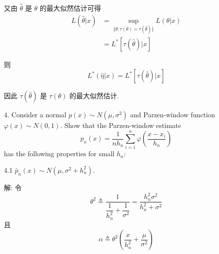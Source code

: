 \documentclass[openany]{ctexbook}
\theoremstyle{kaiti}
\theoremstyle{normal}
\begin{document}
又由 $\hat{\theta}$ 是 $\theta$ 的最大似然估计可得
\begin{equation}
  \begin{aligned}
    L(\hat{\theta}|x)
    &=\sup_{\{\theta:\tau(\theta)=\tau(\hat{\theta})\}}L(\theta|x)\\
    &=L^*[\tau(\hat{\theta})|x]
  \end{aligned}
\end{equation}

则
\begin{equation}
  L^*(\hat{\eta}|x)=L^*[\tau(\hat{\theta})|x]
\end{equation}

因此 $\tau(\hat{\theta})$ 是 $\tau(\theta)$ 的最大似然估计.

4. Consider a normal $p(x)\sim N(\mu,\sigma^2)$ and Parzen-window function ${\varphi(x) \sim N(0,1)}$. Show that the Parzen-window estimate
\begin{equation}
  p_{n}(x)=\frac{1}{nh_n} \sum_{i=1}^{n} \varphi\left(\frac{x-x_{i}}{h_{n}}\right)
\end{equation}
has the following properties for small $h_{n}$:

4.1 $\bar{p}_n(x)\sim N(\mu,\sigma^2+h_n^2)$.

解: 令
\begin{equation}
  \theta^2\triangleq\frac{1}{\dfrac{1}{h_n^2}+\dfrac{1}{\sigma^2}}=\frac{h_n^2\sigma^2}{h_n^2+\sigma^2}
\end{equation}
且
\begin{equation}
  \alpha\triangleq\theta^2\left(\frac{x}{h_n^2}+\frac{\mu}{\sigma^2}\right)
\end{equation}
\end{document}
